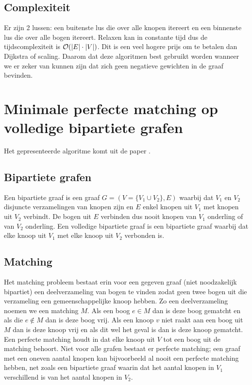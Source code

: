 \documentclass[conference]{IEEEtran}
\theoremstyle{definition}
\DeclarePairedDelimiter{\card}{\vert}{\vert}  %
\begin{document}
\subsection{Complexiteit}
Er zijn 2 lussen: een buitenste lus die over alle knopen itereert en een binnenste lus die over alle bogen itereert. Relaxen kan in constante tijd dus de tijdscomplexiteit is $\mathcal{O}(\card{E} \cdot \card{V})$. Dit is een veel hogere prijs om te betalen dan Dijkstra of scaling. Daarom dat deze algoritmen best gebruikt worden wanneer we er zeker van kunnen zijn dat zich geen negatieve gewichten in de graaf bevinden.


\section{Minimale perfecte matching op volledige bipartiete grafen}
Het gepresenteerde algoritme komt uit de paper  \cite{FasterScaling}.

\subsection{Bipartiete grafen}
Een bipartiete graaf is een graaf $G = (V = \{V_1 \cup V_2\}, E)$ waarbij dat $V_1$ en $V_2$ disjuncte verzamelingen van knopen zijn en $E$ enkel knopen uit $V_1$ met knopen uit $V_2$ verbindt. De bogen uit $E$ verbinden dus nooit knopen van $V_1$ onderling of van $V_2$ onderling. Een volledige bipartiete graaf is een bipartiete graaf waarbij dat elke knoop uit $V_1$ met elke knoop uit $V_2$ verbonden is.

\subsection{Matching}
Het matching probleem bestaat erin voor een gegeven graaf (niet noodzakelijk bipartiet) een deelverzameling van bogen te vinden zodat geen twee bogen uit die verzameling een gemeenschappelijke knoop hebben. Zo een deelverzameling noemen we een matching $M$. Als een boog $e \in M$ dan is deze boog gematcht en als die $e \notin M$ dan is deze boog vrij. Als een knoop $v$ niet raakt aan een boog uit $M$ dan is deze knoop vrij en als dit wel het geval is dan is deze knoop gematcht. Een perfecte matching houdt in dat elke knoop uit $V$ tot een boog uit de matching behoort. Niet voor alle grafen bestaat er perfecte matching; een graaf met een oneven aantal knopen kan bijvoorbeeld al nooit een perfecte matching hebben, net zoals een bipartiete graaf waarin dat het aantal knopen in $V_1$ verschillend is van het aantal knopen in $V_2$.
\end{document}
